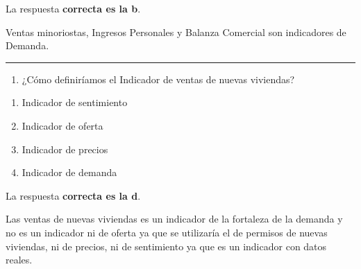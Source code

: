 \documentclass[
  letterpaper,
  DIV=11,
  numbers=noendperiod]{scrreprt}
\providecommand{\tightlist}{%
  \setlength{\itemsep}{0pt}\setlength{\parskip}{0pt}}\usepackage{longtable,booktabs,array}
\begin{document}
\begin{tcolorbox}[enhanced jigsaw, left=2mm, opacityback=0, colback=white, breakable, arc=.35mm, bottomrule=.15mm, rightrule=.15mm, toprule=.15mm, leftrule=.75mm, colframe=quarto-callout-tip-color-frame]
\begin{minipage}[t]{5.5mm}
\textcolor{quarto-callout-tip-color}{\faLightbulb}
\end{minipage}%
\begin{minipage}[t]{\textwidth - 5.5mm}

La respuesta \textbf{correcta es la b}.

Ventas minoriostas, Ingresos Personales y Balanza Comercial son
indicadores de Demanda.

\end{minipage}%
\end{tcolorbox}

\begin{center}\rule{0.5\linewidth}{0.5pt}\end{center}

\begin{enumerate}
\def\labelenumi{\arabic{enumi}.}
\setcounter{enumi}{25}
\tightlist
\item
  ¿Cómo definiríamos el Indicador de ventas de nuevas viviendas?
\end{enumerate}

\begin{enumerate}
\def\labelenumi{\alph{enumi})}
\item
  Indicador de sentimiento
\item
  Indicador de oferta
\item
  Indicador de precios
\item
  Indicador de demanda
\end{enumerate}

\begin{tcolorbox}[enhanced jigsaw, left=2mm, opacityback=0, colback=white, breakable, arc=.35mm, bottomrule=.15mm, rightrule=.15mm, toprule=.15mm, leftrule=.75mm, colframe=quarto-callout-tip-color-frame]
\begin{minipage}[t]{5.5mm}
\textcolor{quarto-callout-tip-color}{\faLightbulb}
\end{minipage}%
\begin{minipage}[t]{\textwidth - 5.5mm}

La respuesta \textbf{correcta es la d}.

Las ventas de nuevas viviendas es un indicador de la fortaleza de la
demanda y no es un indicador ni de oferta ya que se utilizaría el de
permisos de nuevas viviendas, ni de precios, ni de sentimiento ya que es
un indicador con datos reales.

\end{minipage}%
\end{tcolorbox}
\end{document}
